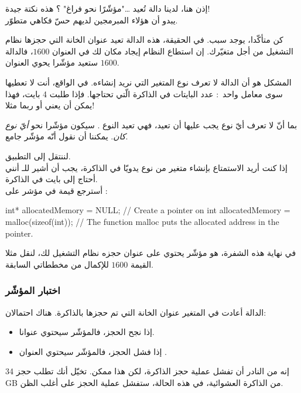 إذن هنا، لدينا دالة تُعيد \dots "مؤشّرًا نحو فراغ" ؟ هذه نكتة جيدة!\\
يبدو أن هؤلاء المبرمجين لديهم حسّ فكاهي متطوّر.

كن متأكّدا، يوجد سبب. في الحقيقة، هذه الدالة تعيد عنوان الخانة التي حجزها نظام التشغيل من أجل متغيّرك. إن استطاع النظام إيجاد مكان لك في العنوان
$1600$،
فالدالة ستعيد مؤشّرا يحوي العنوان
$1600$.

المشكل هو أن الدالة
لا تعرف نوع المتغير التي نريد إنشاءه. في الواقع، أنت لا تعطيها سوى معامل واحد~: عدد البايتات في الذاكرة الّتي تحتاجها. فإذا طلبت 4 بايت، فهذا يمكن أن يعني
أو ربما
مثلا!

بما أنّ
لا تعرف أيّ نوع يجب عليها أن تعيد، فهي تعيد النوع
.
سيكون مؤشّرا نحو
\textit{أيّ نوع كان}.
يمكننا أن نقول أنّه مؤشّر جامع.

لننتقل إلى التطبيق.\\
إذا كنت أريد الاستمتاع بإنشاء متغير من نوع
يدويّا في الذاكرة، يجب أن أشير للـ
أنني أحتاج إلى
بايت في الذاكرة.\\
أسترجع قيمة
في مؤشر على
 :

\begin{Csource}
int* allocatedMemory = NULL; // Create a pointer on int
allocatedMemory = malloc(sizeof(int)); // The function malloc puts the allocated address in the pointer.
\end{Csource}

في نهاية هذه الشفرة،
هو مؤشّر يحتوي على عنوان حجزه نظام التشغيل لك، لنقل مثلا القيمة
$1600$
للإكمال من مخططاتي السابقة.

\subsubsection{اختبار المؤشّر}
الدالة
أعادت في المتغير
عنوان الخانة التي تم حجزها بالذاكرة. هناك احتمالان:
\begin{itemize}
  \item إذا نجح الحجز، فالمؤشّر سيحتوي عنوانا.
  \item إذا فشل الحجز، فالمؤشّر سيحتوي العنوان
.
\end{itemize}

إنه من النادر أن تفشل عملية حجز الذاكرة، لكن هذا ممكن. تخيّل أنك تطلب حجز
\textenglish{34 GB}
من الذاكرة العشوائية، في هذه الحالة، ستفشل عملية الحجز على أغلب الظن.


